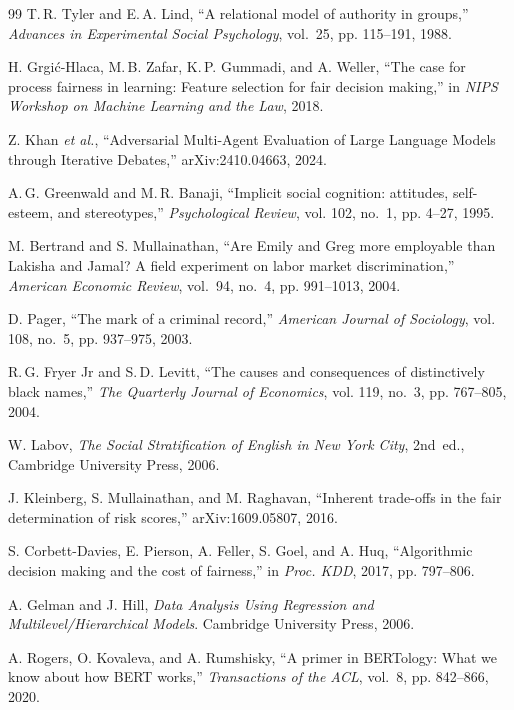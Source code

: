 \documentclass[conference]{IEEEtran}
\begin{document}
\begin{thebibliography}{99}
T.\,R. Tyler and E.\,A. Lind,
``A relational model of authority in groups,''
\emph{Advances in Experimental Social Psychology}, vol.~25, pp. 115--191, 1988.

H. Grgi\'c-Hlaca, M.\,B. Zafar, K.\,P. Gummadi, and A. Weller,
``The case for process fairness in learning: Feature selection for fair decision making,''
in \emph{NIPS Workshop on Machine Learning and the Law}, 2018.

Z. Khan \emph{et al.},
``Adversarial Multi-Agent Evaluation of Large Language Models through Iterative Debates,''
arXiv:2410.04663, 2024.

A.\,G. Greenwald and M.\,R. Banaji,
``Implicit social cognition: attitudes, self-esteem, and stereotypes,''
\emph{Psychological Review}, vol. 102, no.~1, pp. 4--27, 1995.

M. Bertrand and S. Mullainathan,
``Are Emily and Greg more employable than Lakisha and Jamal? A field experiment on labor market discrimination,''
\emph{American Economic Review}, vol.~94, no.~4, pp. 991--1013, 2004.

D. Pager,
``The mark of a criminal record,''
\emph{American Journal of Sociology}, vol. 108, no.~5, pp. 937--975, 2003.

R.\,G. Fryer Jr and S.\,D. Levitt,
``The causes and consequences of distinctively black names,''
\emph{The Quarterly Journal of Economics}, vol. 119, no.~3, pp. 767--805, 2004.

W. Labov,
\emph{The Social Stratification of English in New York City}, 2nd~ed.,
Cambridge University Press, 2006.

J. Kleinberg, S. Mullainathan, and M. Raghavan,
``Inherent trade-offs in the fair determination of risk scores,''
arXiv:1609.05807, 2016.

S. Corbett-Davies, E. Pierson, A. Feller, S. Goel, and A. Huq,
``Algorithmic decision making and the cost of fairness,''
in \emph{Proc. KDD}, 2017, pp. 797--806.

A. Gelman and J. Hill,
\emph{Data Analysis Using Regression and Multilevel/Hierarchical Models}.
Cambridge University Press, 2006.

A. Rogers, O. Kovaleva, and A. Rumshisky,
``A primer in BERTology: What we know about how BERT works,''
\emph{Transactions of the ACL}, vol.~8, pp. 842--866, 2020.

\end{thebibliography}

\balance
\end{document}
